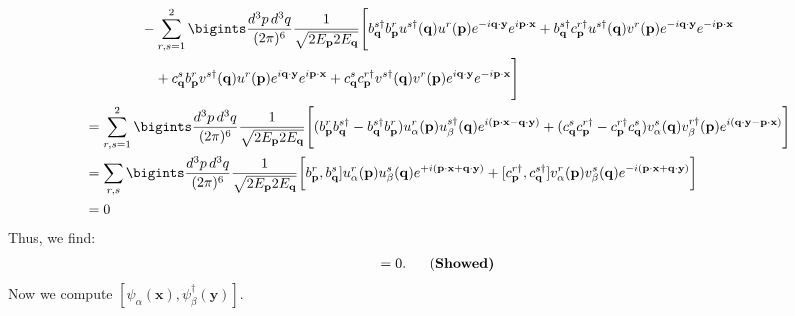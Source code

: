 {\begin{align*}
       &\hspace{40pt} - \sum_{r,s=1}^2 \bigints\frac{d^3p \, d^3q}{(2\pi)^6} \frac{1}{\sqrt{2E_{\mathbf{p}} 2E_{\mathbf{q}}}} \Bigg[ b^{s\dagger}_{\mathbf{q}} b^r_{\mathbf{p}} u^{s\dagger}(\mathbf{q}) u^r(\mathbf{p}) e^{-i \mathbf{q} \cdot \mathbf{y}} e^{i \mathbf{p} \cdot \mathbf{x}} + b^{s\dagger}_{\mathbf{q}} c^{r\dagger}_{\mathbf{p}} u^{s\dagger}(\mathbf{q}) v^r(\mathbf{p}) e^{-i \mathbf{q} \cdot \mathbf{y}} e^{-i \mathbf{p} \cdot \mathbf{x}} \\
       &\hspace{50pt} + c^s_{\mathbf{q}} b^r_{\mathbf{p}} v^{s\dagger}(\mathbf{q}) u^r(\mathbf{p}) e^{i \mathbf{q} \cdot \mathbf{y}} e^{i \mathbf{p} \cdot \mathbf{x}}+ c^s_{\mathbf{q}} c^{r\dagger}_{\mathbf{p}} v^{s\dagger}(\mathbf{q}) v^r(\mathbf{p}) e^{i \mathbf{q} \cdot \mathbf{y}} e^{-i \mathbf{p} \cdot \mathbf{x}} \Bigg]\notag\\
       &= \sum_{r,s=1}^2 \bigints\frac{d^3p \, d^3q}{(2\pi)^6} \frac{1}{\sqrt{2E_{\mathbf{p}} 2E_{\mathbf{q}}}} \Bigg[ (b^r_{\mathbf{p}} b^{s\dagger}_{\mathbf{q}} - b^{s\dagger}_{\mathbf{q}} b^r_{\mathbf{p}}) u^r_\alpha(\mathbf{p}) u^{s\dagger}_\beta(\mathbf{q}) e^{i(\mathbf{p} \cdot \mathbf{x} - \mathbf{q} \cdot \mathbf{y})} +(c^s_{\mathbf{q}} c^{r\dagger}_{\mathbf{p}} - c^{r\dagger}_{\mathbf{p}} c^s_{\mathbf{q}}) v^s_\alpha(\mathbf{q}) v^{r\dagger}_\beta(\mathbf{p}) e^{i(\mathbf{q} \cdot \mathbf{y} - \mathbf{p} \cdot \mathbf{x})} \Bigg]\\
       &=\sum_{r,s} \bigints\frac{d^3p \, d^3q}{(2\pi)^6} \frac{1}{\sqrt{2E_{\mathbf{p}} 2E_{\mathbf{q}}}} \bigg[b^r_{\mathbf{p}}, b^s_{\mathbf{q}}] u^r_\alpha(\mathbf{p}) u^s_\beta(\mathbf{q}) e^{+i(\mathbf{p}\cdot\mathbf{x} + \mathbf{q}\cdot\mathbf{y})}+[c^{r\dagger}_{\mathbf{p}}, c^{s\dagger}_{\mathbf{q}}] v^r_\alpha(\mathbf{p}) v^s_\beta(\mathbf{q}) e^{-i(\mathbf{p}\cdot\mathbf{x} + \mathbf{q}\cdot\mathbf{y})}\bigg]\\
       &=0
   \end{align*}
Thus, we find:
\begin{align}
    [\psi_\alpha(\mathbf{x}), \psi_\beta(\mathbf{y})] = 0.~~~~~\text{(\bf Showed)}
\end{align}
Now we compute $[\psi_\alpha(\mathbf{x}), \psi^\dagger_\beta(\mathbf{y})]$. 

}
